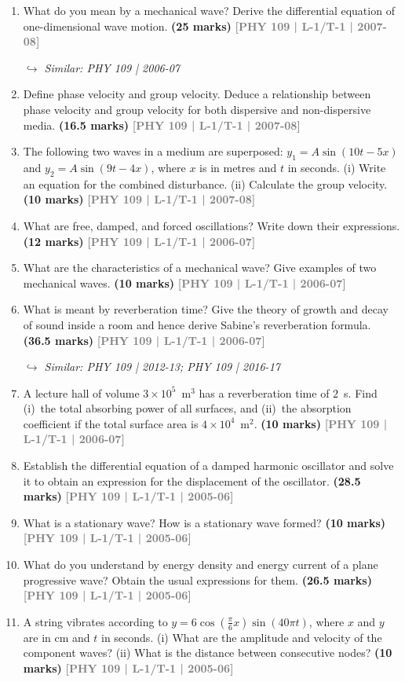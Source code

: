 \documentclass[12pt,a3paper]{article}
\newcommand{\yr}[1]{\hfill\textcolor{gray}{\small\textbf{[#1]}}}
\newcommand{\mk}[1]{\textcolor{orange!70!black}{\small\textbf{(#1 marks)}}}
\newcommand{\variant}[1]{\par\vspace{1pt}\textcolor{blue!50!black}%
  {\footnotesize\textit{$\hookrightarrow$ Similar: #1}}}
\begin{document}
\begin{enumerate}
\item What do you mean by a mechanical wave? Derive the differential equation of one-dimensional wave motion.
\mk{25} \yr{PHY 109 | L-1/T-1 | 2007-08}
\variant{PHY 109 | 2006-07}

\item Define phase velocity and group velocity. Deduce a relationship between phase velocity and group velocity for both dispersive and non-dispersive media.
\mk{16.5} \yr{PHY 109 | L-1/T-1 | 2007-08}

\item The following two waves in a medium are superposed: $y_1 = A\sin(10t - 5x)$ and $y_2 = A\sin(9t - 4x)$, where $x$ is in metres and $t$ in seconds. (i) Write an equation for the combined disturbance. (ii) Calculate the group velocity.
\mk{10} \yr{PHY 109 | L-1/T-1 | 2007-08}

\item What are free, damped, and forced oscillations? Write down their expressions.
\mk{12} \yr{PHY 109 | L-1/T-1 | 2006-07}

\item What are the characteristics of a mechanical wave? Give examples of two mechanical waves.
\mk{10} \yr{PHY 109 | L-1/T-1 | 2006-07}

\item What is meant by reverberation time? Give the theory of growth and decay of sound inside a room and hence derive Sabine's reverberation formula.
\mk{36.5} \yr{PHY 109 | L-1/T-1 | 2006-07}
\variant{PHY 109 | 2012-13; PHY 109 | 2016-17}

\item A lecture hall of volume $3\times10^5$~m$^3$ has a reverberation time of $2$~s. Find (i)~the total absorbing power of all surfaces, and (ii)~the absorption coefficient if the total surface area is $4\times10^4$~m$^2$.
\mk{10} \yr{PHY 109 | L-1/T-1 | 2006-07}

\item Establish the differential equation of a damped harmonic oscillator and solve it to obtain an expression for the displacement of the oscillator.
\mk{28.5} \yr{PHY 109 | L-1/T-1 | 2005-06}

\item What is a stationary wave? How is a stationary wave formed?
\mk{10} \yr{PHY 109 | L-1/T-1 | 2005-06}

\item What do you understand by energy density and energy current of a plane progressive wave? Obtain the usual expressions for them.
\mk{26.5} \yr{PHY 109 | L-1/T-1 | 2005-06}

\item A string vibrates according to $y = 6\cos\!\left(\frac{\pi}{6}x\right)\sin(40\pi t)$, where $x$ and $y$ are in cm and $t$ in seconds. (i) What are the amplitude and velocity of the component waves? (ii) What is the distance between consecutive nodes?
\mk{10} \yr{PHY 109 | L-1/T-1 | 2005-06}

\end{enumerate}
\end{document}
